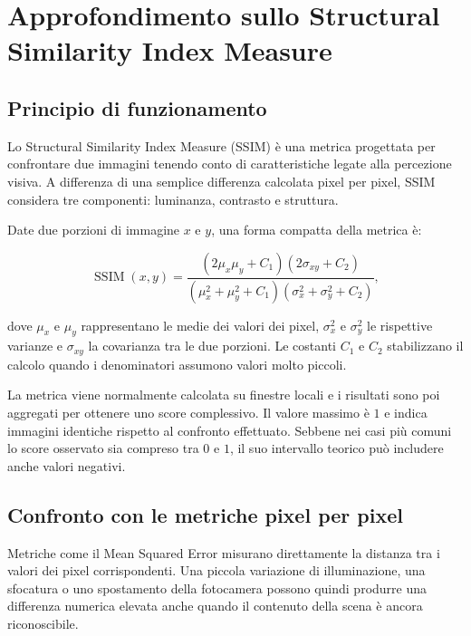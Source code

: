 
\chapter{Approfondimento sullo Structural Similarity Index Measure}
\label{cap:approfondimento-ssim}

\section{Principio di funzionamento}

Lo Structural Similarity Index Measure (SSIM) è una metrica progettata per
confrontare due immagini tenendo conto di caratteristiche legate alla
percezione visiva. A differenza di una semplice differenza calcolata pixel per
pixel, SSIM considera tre componenti: luminanza, contrasto e struttura.

Date due porzioni di immagine \(x\) e \(y\), una forma compatta della metrica è:

\begin{equation}
    \operatorname{SSIM}(x,y)=
    \frac{(2\mu_x\mu_y+C_1)(2\sigma_{xy}+C_2)}
    {(\mu_x^2+\mu_y^2+C_1)(\sigma_x^2+\sigma_y^2+C_2)} ,
    \label{eq:ssim}
\end{equation}

dove \(\mu_x\) e \(\mu_y\) rappresentano le medie dei valori dei pixel,
\(\sigma_x^2\) e \(\sigma_y^2\) le rispettive varianze e \(\sigma_{xy}\) la
covarianza tra le due porzioni. Le costanti \(C_1\) e \(C_2\) stabilizzano il
calcolo quando i denominatori assumono valori molto piccoli.

La metrica viene normalmente calcolata su finestre locali e i risultati sono
poi aggregati per ottenere uno score complessivo. Il valore massimo è \(1\) e
indica immagini identiche rispetto al confronto effettuato. Sebbene nei casi
più comuni lo score osservato sia compreso tra \(0\) e \(1\), il suo intervallo
teorico può includere anche valori negativi.

\section{Confronto con le metriche pixel per pixel}

Metriche come il Mean Squared Error misurano direttamente la distanza tra i
valori dei pixel corrispondenti. Una piccola variazione di illuminazione, una
sfocatura o uno spostamento della fotocamera possono quindi produrre una
differenza numerica elevata anche quando il contenuto della scena è ancora
riconoscibile.

